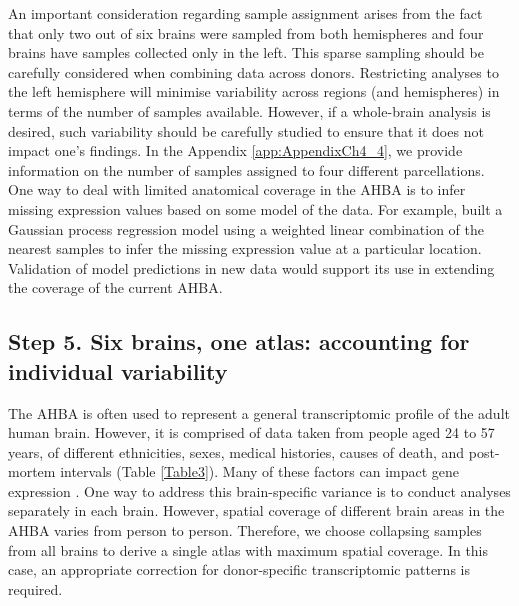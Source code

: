 An important consideration regarding sample assignment arises from the fact that only two out of six brains were sampled from both hemispheres and four brains have samples collected only in the left. This sparse sampling should be carefully considered when combining data across donors. Restricting analyses to the left hemisphere will minimise variability across regions (and hemispheres) in terms of the number of samples available. However, if a whole-brain analysis is desired, such variability should be carefully studied to ensure that it does not impact one’s findings. In the Appendix \ref{app:AppendixCh4_4}, we provide information on the number of samples assigned to four different parcellations. One way to deal with limited anatomical coverage in the AHBA is to infer missing expression values based on some model of the data. For example, \citet{Gryglewski2018} built a Gaussian process regression model using a weighted linear combination of the nearest samples to infer the missing expression value at a particular location. Validation of model predictions in new data would support its use in extending the coverage of the current AHBA.

\subsection*{Step 5. Six brains, one atlas: accounting for individual variability}

The AHBA is often used to represent a general transcriptomic profile of the adult human brain. However, it is comprised of data taken from people aged 24 to 57 years, of different ethnicities, sexes, medical histories, causes of death, and post-mortem intervals (Table \ref{Table3}). Many of these factors can impact gene expression \mbox{\citep{Fraser2005,Berchtold2008,Kumar2013,Trabzuni2013}}. One way to address this brain-specific variance is to conduct analyses separately in each brain. However, spatial coverage of different brain areas in the AHBA varies from person to person. Therefore, we choose collapsing samples from all brains to derive a single atlas with maximum spatial coverage. In this case, an appropriate correction for donor-specific transcriptomic patterns is required.


